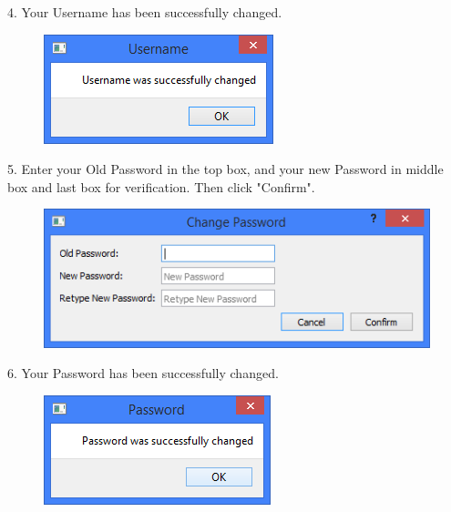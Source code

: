 4. Your Username has been successfully changed.

\begin{figure}[H]
    \includegraphics[width=\textwidth]{./Manual/Tutorial/Q15/UsernameChanged.png}
\end{figure}

5. Enter your Old Password in the top box, and your new Password in middle box and last box for verification. Then click "Confirm".

\begin{figure}[H]
    \includegraphics[width=\textwidth]{./Manual/Tutorial/Q15/ChangePassword.png}
\end{figure}

6. Your Password has been successfully changed.

\begin{figure}[H]
    \includegraphics[width=\textwidth]{./Manual/Tutorial/Q15/PasswordChanged.png}
\end{figure}

